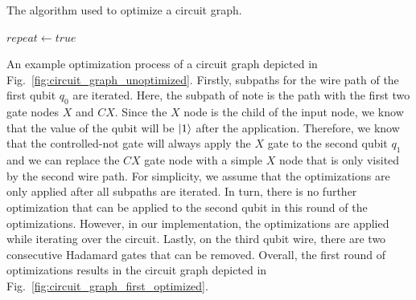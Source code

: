 \begin{algorithm}
    \caption{The algorithm used to optimize a circuit graph.}\label{alg:circuit_optimization}
    \label{alg:concept_optimizationAlgorithm}
    $repeat \gets true$\;
\end{algorithm}

An example optimization process of a circuit graph depicted in Fig.~\ref{fig:circuit_graph_unoptimized}. Firstly, subpaths for the wire path of the first qubit $q_0$ are iterated. Here, the subpath of note is the path with the first two gate nodes $X$ and $CX$. Since the $X$ node is the child of the input node, we know that the value of the qubit will be $\ket{1}$ after the application. Therefore, we know that the controlled-not gate will always apply the $X$ gate to the second qubit $q_1$ and we can replace the $CX$ gate node with a simple $X$ node that is only visited by the second wire path. For simplicity, we assume that the optimizations are only applied after all subpaths are iterated. In turn, there is no further optimization that can be applied to the second qubit in this round of the optimizations. However, in our implementation, the optimizations are applied while iterating over the circuit. Lastly, on the third qubit wire, there are two consecutive Hadamard gates that can be removed. Overall, the first round of optimizations results in the circuit graph depicted in Fig.~\ref{fig:circuit_graph_first_optimized}. 
 
